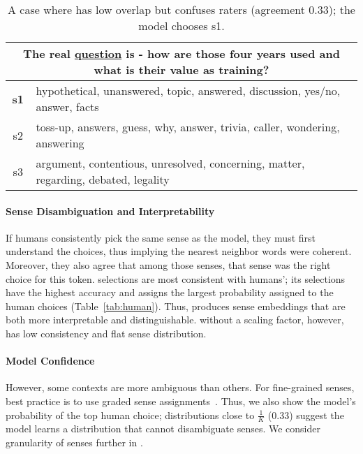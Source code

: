 \begin{table}[t!]
	\small
	\centering
	\begin{tabular}{cp{6.5cm}}
		\toprule
		\multicolumn{2}{p{7.5cm}}{The real \underline{question} is - how are those four years used and what is their value as training?}   \\
		\midrule
		{\bf s1}& hypothetical, unanswered, topic, answered, discussion, yes/no, answer, facts\\
		s2& toss-up, answers, guess, why, answer, trivia, caller, wondering, answering\\
		s3& argument, contentious, unresolved, concerning, matter, regarding, debated, legality\\
		\bottomrule
	\end{tabular} 
	\centering 
	\caption{A case where  has low overlap but confuses raters (agreement 0.33); the model chooses s1.  }
	\label{tab:mssg_ea} 
	
	 
\end{table}


 
\paragraph{Sense Disambiguation and Interpretability} 

If humans consistently pick the same sense as the model, they must
first understand the choices, thus implying the nearest neighbor words
were coherent.
Moreover, they also agree that among those senses, that sense was the
right choice for this token.
\gasi{-$\beta$} selections are most consistent with humans';
its selections have the highest accuracy and assigns the largest probability
assigned to the human choices (Table~\ref{tab:human}).
Thus,
\gasi{-$\beta$} produces sense embeddings that are both more
interpretable and distinguishable. \gasi{} without a scaling factor,
however, has low consistency and flat sense distribution.


 
\paragraph{Model Confidence}

However, some contexts are more ambiguous than others.
For fine-grained senses, best practice is to use graded sense
assignments~\cite{erk-13}.
Thus, we also show the model's probability of the top human choice; distributions
close to $\frac{1}{K}$ (0.33) suggest the model learns a distribution
that cannot disambiguate senses.
We consider granularity of senses further in .


